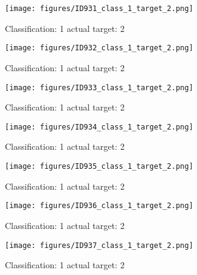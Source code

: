 \begin{figure}[h!]
\begin{center}
\texttt{[image: figures/ID931\_class\_1\_target\_2.png]}
\end{center}
\caption{ Classification: 1 actual target: 2}
\label{fig:ID931_class_1_target_2}
\end{figure}
\begin{figure}[h!]
\begin{center}
\texttt{[image: figures/ID932\_class\_1\_target\_2.png]}
\end{center}
\caption{ Classification: 1 actual target: 2}
\label{fig:ID932_class_1_target_2}
\end{figure}
\begin{figure}[h!]
\begin{center}
\texttt{[image: figures/ID933\_class\_1\_target\_2.png]}
\end{center}
\caption{ Classification: 1 actual target: 2}
\label{fig:ID933_class_1_target_2}
\end{figure}
\begin{figure}[h!]
\begin{center}
\texttt{[image: figures/ID934\_class\_1\_target\_2.png]}
\end{center}
\caption{ Classification: 1 actual target: 2}
\label{fig:ID934_class_1_target_2}
\end{figure}
\begin{figure}[h!]
\begin{center}
\texttt{[image: figures/ID935\_class\_1\_target\_2.png]}
\end{center}
\caption{ Classification: 1 actual target: 2}
\label{fig:ID935_class_1_target_2}
\end{figure}
\begin{figure}[h!]
\begin{center}
\texttt{[image: figures/ID936\_class\_1\_target\_2.png]}
\end{center}
\caption{ Classification: 1 actual target: 2}
\label{fig:ID936_class_1_target_2}
\end{figure}
\begin{figure}[h!]
\begin{center}
\texttt{[image: figures/ID937\_class\_1\_target\_2.png]}
\end{center}
\caption{ Classification: 1 actual target: 2}
\label{fig:ID937_class_1_target_2}
\end{figure}
